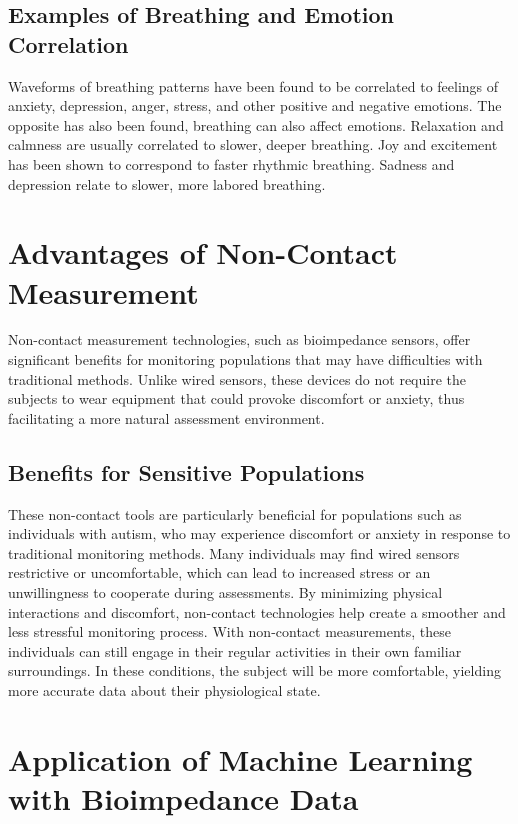 \documentclass[twocolumn]{article}
\begin{document}
\subsection{Examples of Breathing and Emotion Correlation}
Waveforms of breathing patterns have been found to be correlated to feelings of anxiety, depression, anger, stress, and other positive and negative emotions. The opposite has also been found, breathing can also affect emotions.\cite{Jerath_Beveridge_2020} Relaxation and calmness are usually correlated to slower, deeper breathing.\cite{Nasseri_Lagman_Simon_Zhang_Mednick_2021} Joy and excitement has been shown to correspond to faster rhythmic breathing. Sadness and depression relate to slower, more labored breathing. \cite{Crockett_2014}

\section{Advantages of Non-Contact Measurement}

Non-contact measurement technologies, such as bioimpedance sensors, offer significant benefits for monitoring populations that may have difficulties with traditional methods. Unlike wired sensors, these devices do not require the subjects to wear equipment that could provoke discomfort or anxiety, thus facilitating a more natural assessment environment.\cite{Matar_Kaddoum_Carrier_Lina_2021}

\subsection{Benefits for Sensitive Populations}

These non-contact tools are particularly beneficial for populations such as individuals with autism, who may experience discomfort or anxiety in response to traditional monitoring methods. Many individuals may find wired sensors restrictive or uncomfortable, which can lead to increased stress or an unwillingness to cooperate during assessments. By minimizing physical interactions and discomfort, non-contact technologies help create a smoother and less stressful monitoring process. With non-contact measurements, these individuals can still engage in their regular activities in their own familiar surroundings. In these conditions, the subject will be more comfortable, yielding more accurate data about their physiological state.\cite{Boiko_Madrid_Seepold_2023}

\section{Application of Machine Learning with Bioimpedance Data}
\end{document}
